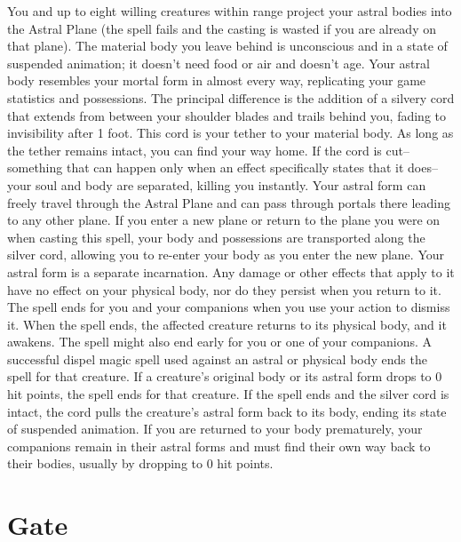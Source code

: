 \documentclass[12pt,showtrims]{memoir}
\begin{document}
\vspace{1\baselineskip}\noindent You and up to eight willing creatures within range project your astral bodies into the Astral Plane (the spell fails and the casting is wasted if you are already on that plane). The material body you leave behind is unconscious and in a state of suspended animation; it doesn't need food or air and doesn't age. Your astral body resembles your mortal form in almost every way, replicating your game statistics and possessions. The principal difference is the addition of a silvery cord that extends from between your shoulder blades and trails behind you, fading to invisibility after 1 foot. This cord is your tether to your material body. As long as the tether remains intact, you can find your way home. If the cord is cut--something that can happen only when an effect specifically states that it does--your soul and body are separated, killing you instantly. Your astral form can freely travel through the Astral Plane and can pass through portals there leading to any other plane. If you enter a new plane or return to the plane you were on when casting this spell, your body and possessions are transported along the silver cord, allowing you to re-enter your body as you enter the new plane. Your astral form is a separate incarnation. Any damage or other effects that apply to it have no effect on your physical body, nor do they persist when you return to it. The spell ends for you and your companions when you use your action to dismiss it. When the spell ends, the affected creature returns to its physical body, and it awakens. The spell might also end early for you or one of your companions. A successful dispel magic spell used against an astral or physical body ends the spell for that creature. If a creature's original body or its astral form drops to 0 hit points, the spell ends for that creature. If the spell ends and the silver cord is intact, the cord pulls the creature's astral form back to its body, ending its state of suspended animation. If you are returned to your body prematurely, your companions remain in their astral forms and must find their own way back to their bodies, usually by dropping to 0 hit points.
\FloatBarrier
\newpage
{}
\newpage
\section*{Gate}
\end{document}
